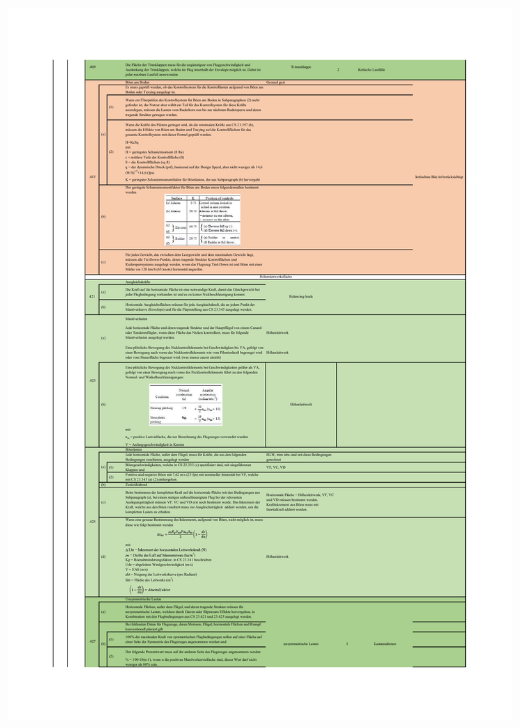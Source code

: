 \begin{table}[H]
\centering
\includegraphics[width=1.0\textwidth, trim={19mm 19mm 19mm 19mm}, clip]{bilder/Tabellen/MPP_Konstruktion_5.pdf}
\end{table}

